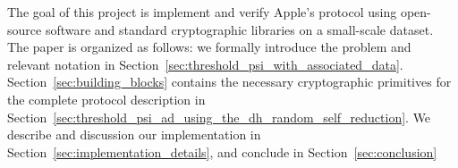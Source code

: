 The goal of this project is implement and verify Apple's protocol using open-source software and standard cryptographic libraries on a small-scale dataset. The paper is organized as follows: we formally introduce the problem and relevant notation in Section~\ref{sec:threshold_psi_with_associated_data}. Section~\ref{sec:building_blocks} contains the necessary cryptographic primitives for the complete protocol description in Section~\ref{sec:threshold_psi_ad_using_the_dh_random_self_reduction}. We describe and discussion our implementation in Section~\ref{sec:implementation_details}, and conclude in Section~\ref{sec:conclusion}


% 	

